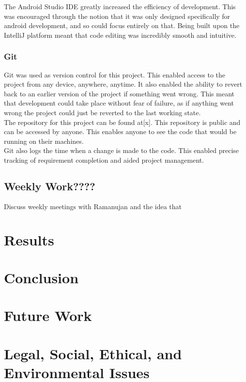 \documentclass{article}
\begin{document}
The Android Studio IDE greatly increased the efficiency of development. This was encouraged through the notion that it was only designed specifically for android development, and so could focus entirely on that. Being built upon the IntelliJ platform meant that code editing was incredibly smooth and intuitive. \\

\subsubsection{Git}

Git was used as version control for this project. This enabled access to the project from any device, anywhere, anytime. It also enabled the ability to revert back to an earlier version of the project if something went wrong. This meant that development could take place without fear of failure, as if anything went wrong the project could just be reverted to the last working state.\\

The repository for this project can be found at[x]. This repository is public and can be accessed by anyone. This enables anyone to see the code that would be running on their machines.\\

Git also logs the time when a change is made to the code. This enabled precise tracking of requirement completion and aided project management. \\

\subsection{Weekly Work????}

Discuss weekly meetings with Ramanujan and the idea that 

\section{Results}

\section{Conclusion}

\section{Future Work}

\section{Legal, Social, Ethical, and Environmental Issues}
\end{document}
